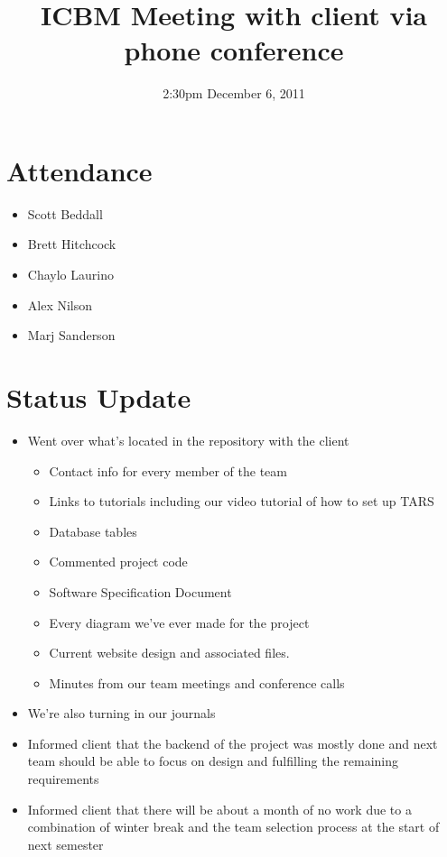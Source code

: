 \documentclass{article}
\begin{document}
\title{ICBM Meeting with client via phone conference}
\date{2:30pm December 6, 2011}
\maketitle

\section{Attendance}
\begin{itemize}
\item Scott Beddall
\item Brett Hitchcock
\item Chaylo Laurino
\item Alex Nilson
\item Marj Sanderson
\end{itemize}

\section{Status Update}
\begin{itemize}
\item Went over what's located in the repository with the client
	\begin{itemize}
	\item Contact info for every member of the team
	\item Links to tutorials including our video tutorial of how to set up TARS
	\item Database tables
	\item Commented project code
	\item Software Specification Document
	\item Every diagram we've ever made for the project
	\item Current website design and associated files.
	\item Minutes from our team meetings and conference calls
	\end{itemize}
\item We're also turning in our journals
\item Informed client that the backend of the project was mostly done and next team should be able to focus on design and fulfilling the remaining requirements
\item Informed client that there will be about a month of no work due to a combination of winter break and the team selection process at the start of next semester
\end{itemize}
\end{document}
